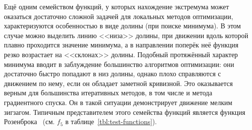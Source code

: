 Ещё одним семейством функций, у которых нахождение экстремума может
оказаться достаточно сложной задачей для локальных методов
оптимизации, характеризуются особенностью в виде долины (при поиске
минимума). В этом случае можно выделить линию <<низа>> долины, при
движении вдоль которой плавно проходится значение минимума, а
в направлении поперёк неё функция резко возрастает на <<склонах>>
долины. Подобный протяжённый характер минимума вводит в заблуждение
большинство алгоритмов оптимизации: они достаточно быстро попадают в
низ долины, однако плохо справляются с движением по нему, если он
обладает заметной кривизной. Это оказывается верным для
большинства итеративных методов, в том числе и метода градиентного
спуска. Он в такой ситуации демонстрирует движение мелким
зигзагом. Типичным представителем этого семейства функций является
функция Розенброка~\cite{Rosenbrock-1960}
(см. $f_5$ в таблице~\ref{tbl:test-functions}).

